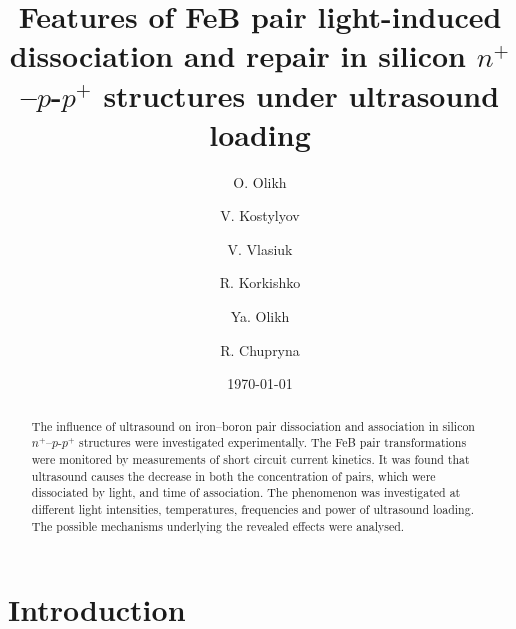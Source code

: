 \documentclass[%
 aip,
 amsmath,amssymb,
 reprint,%
]{revtex4-1}
\begin{document}

\title[FeB transformations under ultrasound loading]{Features of FeB pair light-induced dissociation and repair in silicon $n^+$–$p$-$p^+$ structures under ultrasound loading}
\author{O. Olikh}
\author{V. Kostylyov}%
\author{V. Vlasiuk}
\author{R. Korkishko}
\author{Ya. Olikh}
%

\author{R. Chupryna}


\date{\today}%

\begin{abstract}
The influence of ultrasound on iron--boron pair dissociation and association in silicon $n^+$–$p$-$p^+$ structures were investigated experimentally.
The FeB pair transformations were monitored by measurements of  short circuit current kinetics.
It was found that ultrasound causes the decrease in both the concentration of pairs, which were dissociated by light, and time of association.
The phenomenon was investigated at different light intensities, temperatures, frequencies and power of ultrasound loading.
The possible mechanisms underlying the revealed  effects were analysed.
\end{abstract}

\maketitle


\section{\label{sec:Int}Introduction}
\end{document}

